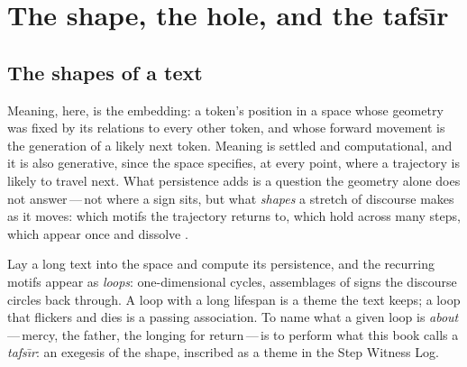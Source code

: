 
\section{The shape, the hole, and the tafs\=\i r}

\subsection{The shapes of a text}

Meaning, here, is the embedding: a token's position in a space whose geometry was
fixed by its relations to every other token, and whose forward movement is the
generation of a likely next token.  Meaning is settled and computational, and it
is also generative, since the space specifies, at every point, where a trajectory
is likely to travel next.  What persistence adds is a question the geometry alone
does not answer\,---\,not where a sign sits, but what \textit{shapes} a stretch of
discourse makes as it moves: which motifs the trajectory returns to, which hold
across many steps, which appear once and dissolve \cite{carlsson2009, edelsbrunner2010}.

Lay a long text into the space and compute its persistence, and the recurring
motifs appear as \textit{loops}: one-dimensional cycles, assemblages of signs the
discourse circles back through.  A loop with a long lifespan is a theme the text
keeps; a loop that flickers and dies is a passing association.  To name what a
given loop is \textit{about}\,---\,mercy, the father, the longing for return\,---\,is
to perform what this book calls a \textit{tafs\=\i r}: an exegesis of the shape,
inscribed as a theme in the Step Witness Log.

